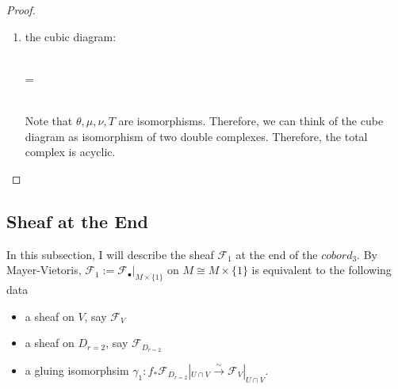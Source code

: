 \begin{proof}
\begin{enumerate}[label = (\roman*)]
\item the cubic diagram:\\
\\
=\\
\\ Note that $\theta,\mu,\nu,T$ are isomorphisms. Therefore, we can think of the cube diagram as isomorphism of two double complexes. Therefore, the total complex is acyclic.
\end{enumerate}
\end{proof}

\subsection*{Sheaf at the End}
In this subsection, I will describe the sheaf $\mathscr{F}_1$ at the end of the $cobord_3$. By Mayer-Vietoris, $\mathscr{F}_1:= \mathscr{F}_\bullet|_{M\times\{1\}}$ on $M \cong M\times\{1\}$ is equivalent to the following data
\begin{itemize}
\item a sheaf on $V$, say $\mathscr{F}_{V}$

\item a sheaf on $D_{r=2}$, say $\mathscr{F}_{D_{r=2}}$

\item a gluing isomorphsim $\gamma_1 : f_*\mathscr{F}_{D_{r=2}}|_{U\cap V} \xrightarrow{\sim} \mathscr{F}_{V}|_{U\cap V}$.
\end{itemize}

